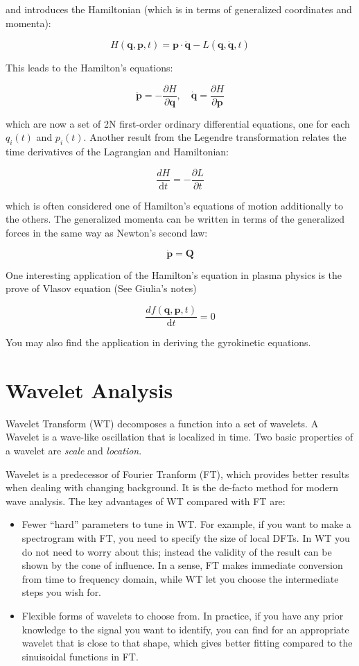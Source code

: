 \documentclass[
  notoc %
]{tufte-book}
\providecommand{\tightlist}{%
  \setlength{\itemsep}{0pt}\setlength{\parskip}{0pt}
}
\begin{document}
and introduces the Hamiltonian (which is in terms of generalized
coordinates and momenta):

\[
H(\mathbf{q},\mathbf{p},t) = \mathbf{p}\cdot\dot{\mathbf{q}} - L(\mathbf{q},\dot{\mathbf{q}},t)
\]

This leads to the Hamilton's equations:

\[
\dot{\mathbf{p}} = -\frac{\partial H}{\partial\mathbf{q}},\quad\dot{\mathbf{q}} = \frac{\partial H}{\partial \mathbf{p}}
\]

which are now a set of 2N first-order ordinary differential equations,
one for each \(q_i(t)\) and \(p_i(t)\). Another result from the Legendre
transformation relates the time derivatives of the Lagrangian and
Hamiltonian:

\[
\frac{dH}{\mathrm{d}t} = -\frac{\partial L}{\partial t}
\]

which is often considered one of Hamilton's equations of motion
additionally to the others. The generalized momenta can be written in
terms of the generalized forces in the same way as Newton's second law:

\[
\dot{\mathbf{p}} = \mathbf{Q}
\]

One interesting application of the Hamilton's equation in plasma physics
is the prove of Vlasov equation (See Giulia's notes)

\[
\frac{df(\mathbf{q},\mathbf{p},t)}{\mathrm{d}t} = 0
\]

You may also find the application in deriving the gyrokinetic equations.

\hypertarget{wavelet-analysis}{%
\section{Wavelet Analysis}\label{wavelet-analysis}}

Wavelet Transform (WT) decomposes a function into a set of wavelets. A
Wavelet is a wave-like oscillation that is localized in time. Two basic
properties of a wavelet are \emph{scale} and \emph{location}.

Wavelet is a predecessor of Fourier Tranform (FT), which provides better
results when dealing with changing background. It is the de-facto method
for modern wave analysis. The key advantages of WT compared with FT are:

\begin{itemize}
\tightlist
\item
  Fewer ``hard'' parameters to tune in WT. For example, if you want to
  make a spectrogram with FT, you need to specify the size of local
  DFTs. In WT you do not need to worry about this; instead the validity
  of the result can be shown by the cone of influence. In a sense, FT
  makes immediate conversion from time to frequency domain, while WT let
  you choose the intermediate steps you wish for.
\item
  Flexible forms of wavelets to choose from. In practice, if you have
  any prior knowledge to the signal you want to identify, you can find
  for an appropriate wavelet that is close to that shape, which gives
  better fitting compared to the sinuisoidal functions in FT.
\end{itemize}
\end{document}
